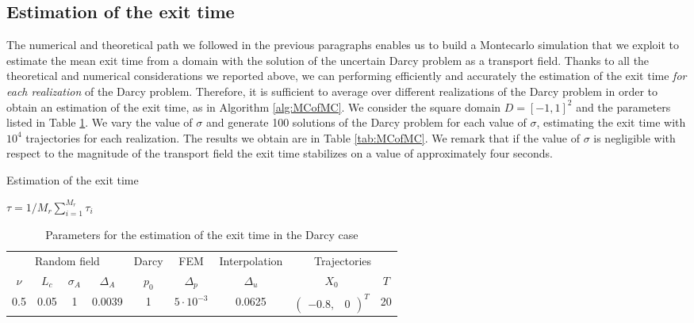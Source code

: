\subsection{Estimation of the exit time}

The numerical and theoretical path we followed in the previous paragraphs enables us to build a Montecarlo simulation that we exploit to estimate the mean exit time from a domain with the solution of the uncertain Darcy problem as a transport field. Thanks to all the theoretical and numerical considerations we reported above, we can performing efficiently and accurately the estimation of the exit time \textit{for each realization} of the Darcy problem. Therefore, it is sufficient to average over different realizations of the Darcy problem in order to obtain an estimation of the exit time, as in Algorithm \ref{alg:MCofMC}. We consider the square domain $D = [-1, 1]^2$ and the parameters listed in Table \ref{tab:MCPar}. We vary the value of $\sigma$ and generate 100 solutions of the Darcy problem for each value of $\sigma$, estimating the exit time with $10^4$ trajectories for each realization. The results we obtain are in Table \ref{tab:MCofMC}. We remark that if the value of $\sigma$ is negligible with respect to the magnitude of the transport field the exit time stabilizes on a value of approximately four seconds.

\begin{algorithm}[t]
\caption{Estimation of the exit time}
$\tau = 1/M_r \sum_{i = 1}^{M_r} \tau_i$ \;
\label{alg:MCofMC}
\end{algorithm}

\begin{table}[H]
\centering
\begin{tabular}{ccccccccc}
\toprule
\multicolumn{4}{c}{Random field} & \multicolumn{1}{c}{Darcy} & \multicolumn{1}{c}{FEM} & \multicolumn{1}{c}{Interpolation} & \multicolumn{2}{c}{Trajectories} \\ 
\cmidrule{1-4} \cmidrule{8-9}
$\nu$    & $L_c$ & $\sigma_A$ & $\Delta_A$ & $p_0$ & $\Delta_p$ & $\Delta_u$ & $X_0$ & $T$ \\
\midrule
0.5 & 0.05 & 1 & 0.0039 & 1 & $5\cdot 10^{-3}$ & 0.0625 & $\begin{pmatrix} -0.8, & 0 \end{pmatrix}^T$ & 20\\
\bottomrule
\end{tabular}
\caption{Parameters for the estimation of the exit time in the Darcy case}
\label{tab:MCPar}
\end{table}

